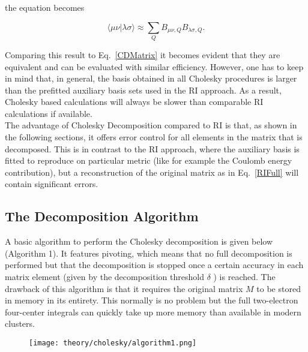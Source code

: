 the equation becomes 

\begin{equation}
\langle \mu \nu | \lambda \sigma \rangle \approx \sum_{Q} B_{\mu \nu,Q} B_{\lambda \sigma,Q}.
\end{equation} 

Comparing this result to Eq.~\ref{CDMatrix} it becomes evident that they are equivalent and can be evaluated with similar efficiency. However, one has to keep in mind that, in general, the basis obtained in all Cholesky procedures is larger than the prefitted auxiliary basis sets used in the RI approach. As a result, Cholesky based calculations will always be slower than comparable RI calculations if available.\\

The advantage of Cholesky Decomposition compared to RI is that, as shown in the following sections, it offers error control for all elements in the matrix that is decomposed. This is in contrast to the RI approach, where the auxiliary basis is fitted to reproduce on particular metric (like for example the Coulomb energy contribution), but a reconstruction of the original matrix as in Eq.~\ref{RIFull} will contain significant errors.


\subsection{The Decomposition Algorithm}

A basic algorithm to perform the Cholesky decomposition is given below (Algorithm 1). It features pivoting, which means that no full decomposition is performed but that the decomposition is stopped once a certain accuracy in each matrix element (given by the decomposition threshold $\delta$ ) is reached. The drawback of this algorithm is that it requires the original matrix $M$ to be stored in memory in its entirety. This normally is no problem but the full two-electron four-center integrals can quickly take up more memory than available in modern clusters.

\begin{figure}[h!]
	\texttt{[image: theory/cholesky/algorithm1.png]}
\end{figure}

